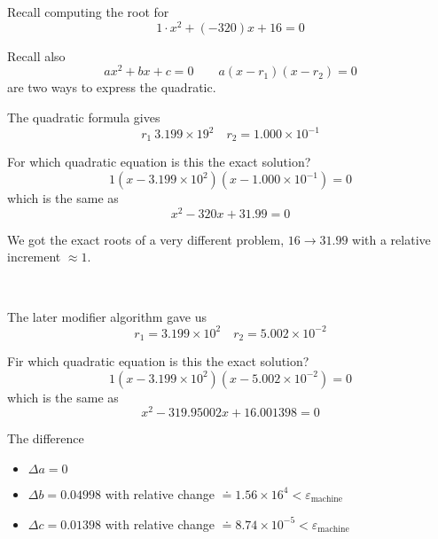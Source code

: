 \begin{example}
    \setlength{\parindent}{0pt}

    Recall computing the root for \[
        1 \cdot x^2 + (-320)x + 16 = 0
    \]

    Recall also \[
        ax^2 + bx + c = 0 \qquad a(x - r_1)(x - r_2) = 0
    \] are two ways to express the quadratic.

    The quadratic formula gives \[
        r_1 \ 3.199 \times 19^2 \quad r_2 = 1.000 \times 10^{-1}
    \]

    For which quadratic equation is this the exact solution? \[
        1(x - 3.199 \times 10^2)(x - 1.000 \times 10^{-1}) = 0
    \] which is the same as \[
        x^2 - 320x + 31.99 = 0
    \]

    We got the exact roots of a very different problem, \( 16 \to 31.99 \) with a relative increment \( \approx 1 \).

    {~~~}

    The later modifier algorithm gave us \[
        r_1 = 3.199 \times 10^2 \quad r_2 = 5.002 \times 10^{-2}
    \]

    Fir which quadratic equation is this the exact solution? \[
        1(x - 3.199 \times 10^2)(x - 5.002 \times 10^{-2}) = 0
    \] which is the same as \[
        x^2 - 319.95002x + 16.001398 = 0
    \]

    The difference 
    \begin{itemize}
        \item \( \Delta a = 0 \)
        \item \( \Delta b = 0.04998 \) with relative change \( \doteq 1.56 \times 16^4 < \varepsilon_{\text{machine}} \)
        \item \( \Delta c = 0.01398 \) with relative change \( \doteq 8.74 \times 10^{-5} < \varepsilon_{\text{machine}} \)
    \end{itemize}
\end{example}